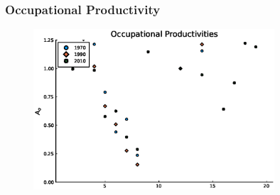 \documentclass[11pt]{beamer}
\begin{document}
\begin{frame}
\frametitle{Occupational Productivity}
\begin{figure}
\begin{center}
\includegraphics[width=0.8\textwidth]{A_men_70_10.eps}
\label{ }
\end{center}
\end{figure}
\hyperlink{occupations}{}
\hyperlink{barriers3}{}
\end{frame}
\end{document}
